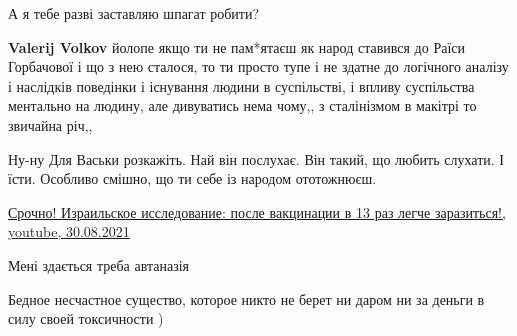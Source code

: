 \begin{itemize}
\begin{itemize}
А я тебе разві заставляю шпагат робити?

 
\textbf{Valerij Volkov} йолопе якщо ти не пам*ятаєш як народ ставився до Раїси
Горбачової і що з нею сталося, то ти просто тупе і не здатне до логічного
аналізу і наслідків поведінки і існування людини в суспільстві, і впливу
суспільства ментально на людину, але дивуватись нема чому,, з сталінізмом в
макітрі то звичайна річ,,

 
Ну-ну
Для Васьки розкажіть.
Най він послухає.
Він такий, що любить слухати. І їсти.
Особливо смішно, що ти себе із народом ототожнюєш.

 
\href{https://youtu.be/Hw052FqifFw}{%
Срочно! Израильское исследование: после вакцинации в 13 раз легче заразиться!, youtube, 30.08.2021%
}

\end{itemize}

 
Мені здається треба автаназія

 

Бедное несчастное существо, которое никто не берет ни даром ни за деньги в силу
своей токсичности )


\end{itemize}
